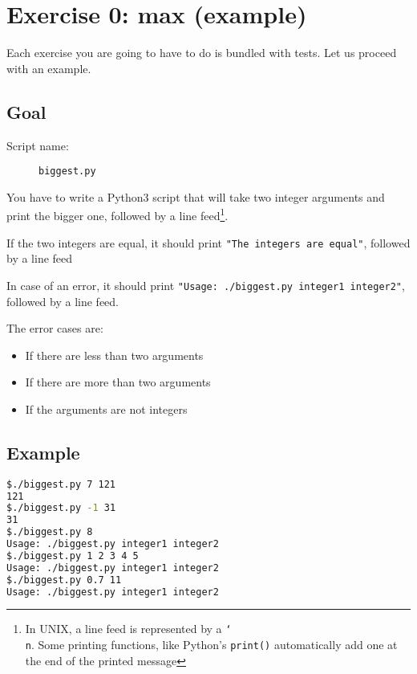 \documentclass[12pt]{article}
\begin{document}
\section{Exercise 0: max (example)}

Each exercise you are going to have to do is bundled with tests.
Let us proceed with an example.

\subsection{Goal}

\begin{description}
        \item[Script name:] \texttt{biggest.py}
\end{description}

You have to write a Python3 script that will take two integer arguments and print the bigger one, followed by a line feed\footnote{In UNIX, a line feed is represented by a \texttt{\char`\\
n}. Some printing functions, like Python's \texttt{print()} automatically add one at the end of the printed message}.

If the two integers are equal, it should print \texttt{"The integers are equal"}, followed by a line feed

In case of an error, it should print \texttt{"Usage: ./biggest.py integer1 integer2"}, followed by a line feed.

The error cases are:

\begin{itemize}
	\item If there are less than two arguments
	\item If there are more than two arguments
	\item If the arguments are not integers
\end{itemize}

\subsection{Example}

\begin{lstlisting}[language=bash]
$./biggest.py 7 121
121
$./biggest.py -1 31
31
$./biggest.py 8
Usage: ./biggest.py integer1 integer2
$./biggest.py 1 2 3 4 5
Usage: ./biggest.py integer1 integer2
$./biggest.py 0.7 11
Usage: ./biggest.py integer1 integer2
\end{lstlisting}
\end{document}
